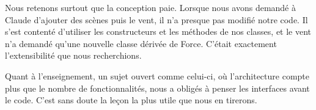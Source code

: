\documentclass[11pt,a4paper]{article}
\newcommand{\code}[1]{{\ttfamily\color{combislate}#1}}
\begin{document}
Nous retenons surtout que la conception paie. Lorsque nous avons demandé à Claude d'ajouter des scènes
puis le vent, il n'a presque pas modifié notre code. Il s'est contenté d'utiliser les constructeurs et
les méthodes de nos classes, et le vent n'a demandé qu'une nouvelle classe dérivée de \code{Force}.
C'était exactement l'extensibilité que nous recherchions.

Quant à l'enseignement, un sujet ouvert comme celui-ci, où l'architecture compte plus que le nombre de
fonctionnalités, nous a obligés à penser les interfaces avant le code. C'est sans doute la leçon la
plus utile que nous en tirerons.
\end{document}
